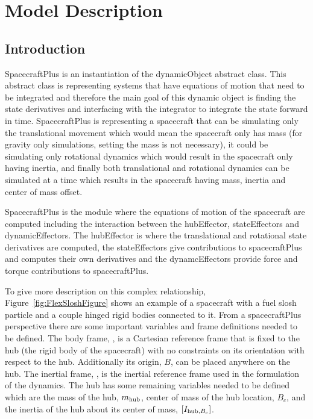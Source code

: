 \section{Model Description}

\subsection{Introduction}

SpacecraftPlus is an instantiation of the dynamicObject abstract class. This abstract class is representing systems that have equations of motion that need to be integrated and therefore the main goal of this dynamic object is finding the state derivatives and interfacing with the integrator to integrate the state forward in time. SpacecraftPlus is representing a spacecraft that can be simulating only the translational movement which would mean the spacecraft only has mass (for gravity only simulations, setting the mass is not necessary), it could be simulating only rotational dynamics which would result in the spacecraft only having inertia, and finally both translational and rotational dynamics can be simulated at a time which results in the spacecraft having mass, inertia and center of mass offset.

SpacecraftPlus is the module where the equations of motion of the spacecraft are computed including the interaction between the hubEffector, stateEffectors and dynamicEffectors. The hubEffector is where the translational and rotational state derivatives are computed, the stateEffectors give contributions to spacecraftPlus and computes their own derivatives and the dynamcEffectors provide force and torque contributions to spacecraftPlus.

To give more description on this complex relationship, Figure~\ref{fig:FlexSloshFigure} shows an example of a spacecraft with a fuel slosh particle and a couple hinged rigid bodies connected to it. From a spacecraftPlus perspective there are some important variables and frame definitions needed to be defined. The body frame, , is a Cartesian reference frame that is fixed to the hub (the rigid body of the spacecraft) with no constraints on its orientation with respect to the hub. Additionally its origin, $B$, can be placed anywhere on the hub. The inertial frame, , is the inertial reference frame used in the formulation of the dynamics. The hub has some remaining variables needed to be defined which are the mass of the hub, $m_{\textnormal{hub}}$, center of mass of the hub location, $B_c$, and the inertia of the hub about its center of mass, $[I_{\textnormal{hub},B_c}]$. 

